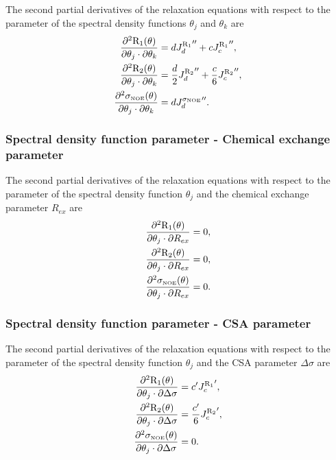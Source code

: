 The second partial derivatives of the relaxation equations with respect to the parameter of the spectral density functions $\theta_j$ and $\theta_k$ are
\begin{align}
    \frac{\partial^2 \mathrm{R}_1(\theta)}{\partial \theta_j \cdot \partial \theta_k} &= d {J_d^{\mathrm{R}_1}}'' + c {J_c^{\mathrm{R}_1}}'',                      \label{eq: Ri': d2R1/dmfj.dmfk} \\
    \frac{\partial^2 \mathrm{R}_2(\theta)}{\partial \theta_j \cdot \partial \theta_k} &= \frac{d}{2} {J_d^{\mathrm{R}_2}}'' + \frac{c}{6} {J_c^{\mathrm{R}_2}}'',  \label{eq: Ri': d2R2/dmfj.dmfk} \\
    \frac{\partial^2 \sigma_{\scriptscriptstyle \mathrm{NOE}}(\theta)}{\partial \theta_j \cdot \partial \theta_k} &= d {J_d^{\sigma_{\scriptscriptstyle \mathrm{NOE}}}}''.                          \label{eq: Ri': d2sigmaNOE/dmfj.dmfk}
\end{align}


\subsubsection{Spectral density function parameter - Chemical exchange parameter}

The second partial derivatives of the relaxation equations with respect to the parameter of the spectral density function $\theta_j$ and the chemical exchange parameter $R_{ex}$ are
\begin{align}
    \frac{\partial^2 \mathrm{R}_1(\theta)}{\partial \theta_j \cdot \partial R_{ex}} &= 0,        \label{eq: Ri': d2R1/dmfj.dRex} \\
    \frac{\partial^2 \mathrm{R}_2(\theta)}{\partial \theta_j \cdot \partial R_{ex}} &= 0,        \label{eq: Ri': d2R2/dmfj.dRex} \\
    \frac{\partial^2 \sigma_{\scriptscriptstyle \mathrm{NOE}}(\theta)}{\partial \theta_j \cdot \partial R_{ex}} &= 0. \label{eq: Ri': d2sigmaNOE/dmfj.dRex}
\end{align}


\subsubsection{Spectral density function parameter - CSA parameter}

The second partial derivatives of the relaxation equations with respect to the parameter of the spectral density function $\theta_j$ and the CSA parameter $\Delta\sigma$ are
\begin{align}
    \frac{\partial^2 \mathrm{R}_1(\theta)}{\partial \theta_j \cdot \partial \Delta\sigma} &= c' {J_c^{\mathrm{R}_1}}',            \label{eq: Ri': d2R1/dmfj.dCSA} \\
    \frac{\partial^2 \mathrm{R}_2(\theta)}{\partial \theta_j \cdot \partial \Delta\sigma} &= \frac{c'}{6} {J_c^{\mathrm{R}_2}}',  \label{eq: Ri': d2R2/dmfj.dCSA} \\
    \frac{\partial^2 \sigma_{\scriptscriptstyle \mathrm{NOE}}(\theta)}{\partial \theta_j \cdot \partial \Delta\sigma} &= 0.                   \label{eq: Ri': d2sigmaNOE/dmfj.dCSA}
\end{align}


